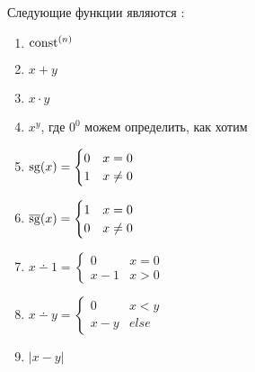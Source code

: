 \begin{lm}\label{lm:rec}
    Следующие функции являются \prf:
	\begin{enumerate}
	\item $ \textmd{const} ^{(n)}$ 
	\item $ x + y$ 
	\item $ x\cdot y$ 
	\item $ x ^{y}$, где $ 0^{0}$ можем определить, как хотим
	\item $ \operatorname{sg}(x) = \begin{cases}
			0 & x= 0 \\
			1 & x\ne 0
		\end{cases}$
	\item $ \operatorname{\overline{sg}}(x) = \begin{cases}
			1 & x= 0 \\
			0 & x\ne 0
		\end{cases}$
	\item $ x \dotminus 1 = \begin{cases}
			0 & x = 0 \\
			x - 1 & x > 0
		\end{cases}$ 
	\item $ x \dotminus y = \begin{cases}
			0 & x < y \\
			x - y & else
		\end{cases}$ 
	\item $ \lvert x - y \rvert $
	\end{enumerate}
\end{lm}
